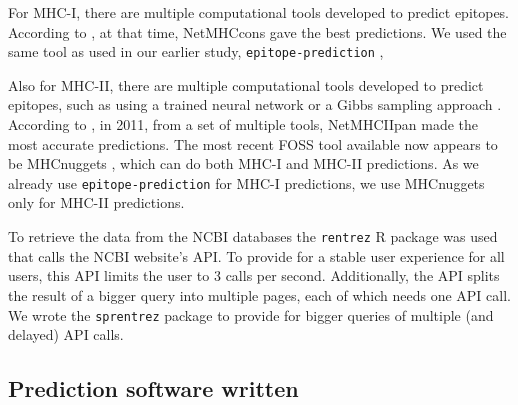 
For MHC-I, there are multiple computational tools developed 
to predict epitopes. 
According to \cite{lundegaard2011prediction}, at that time,
NetMHCcons \cite{karosiene2012netmhccons} gave the best predictions.
We used the same tool as used in our earlier study, 
\verb;epitope-prediction; \cite{bianchi2017},


Also for MHC-II, there are multiple computational tools developed 
to predict epitopes,
such as using a trained neural network \cite{nielsen2003reliable}
or a Gibbs sampling approach \cite{nielsen2004improved}.
According to \cite{lundegaard2011prediction}, in 2011,
from a set of multiple tools, 
\mbox{NetMHCIIpan} \cite{nielsen2008quantitative,karosiene2013netmhciipan}
made the most accurate predictions.
The most recent FOSS tool available now appears
to be MHCnuggets \cite{shao2020high}, which can do both MHC-I 
and MHC-II predictions. 
As we already use \verb;epitope-prediction; \cite{bianchi2017} 
for MHC-I predictions, we use MHCnuggets only for MHC-II predictions.


To retrieve the data from the NCBI databases the
\verb;rentrez; R package \cite{rentrez} was used
that calls the NCBI website's API. To provide for a 
stable user experience for all users, 
this API limits the user to 3 calls per second.
Additionally, the API splits the result of a bigger
query into multiple pages, each of which needs one API call.
We wrote the \verb;sprentrez; package \cite{sprentrez} to provide for 
bigger queries of multiple (and delayed) API calls.

\clearpage

\subsection{Prediction software written}

